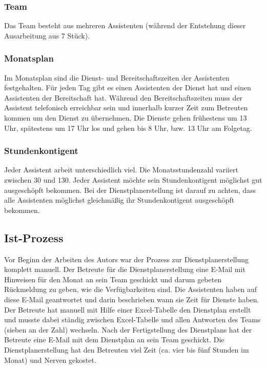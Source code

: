 \documentclass[12pt,a4paper,titlepage]{article} %
\begin{document}
\subsubsection{Team}
Das Team besteht aus mehreren Assistenten (während der Entstehung dieser Ausarbeitung aus 7 Stück).

\subsubsection{Monatsplan}
Im Monatsplan sind die Dienst- und Bereitschaftszeiten der Assistenten festgehalten. Für jeden Tag gibt es einen Assistenten der Dienst hat und einen Assistenten der Bereitschaft hat. Während den Bereitschaftszeiten muss der Assistent telefonisch erreichbar sein und innerhalb kurzer Zeit zum Betreuten kommen um den Dienst zu übernehmen. Die Dienste gehen frühestens um 13 Uhr, spätestens um 17 Uhr los und gehen bis 8 Uhr, bzw. 13 Uhr am Folgetag. 

\subsubsection{Stundenkontigent}
Jeder Assistent arbeit unterschiedlich viel. Die Monatsstundenzahl variiert zwischen 30 und 130. Jeder Assistent möchte sein Stundenkontigent möglichst gut ausgeschöpft bekommen. Bei der Dienstplanerstellung ist darauf zu achten, dass alle Assistenten möglichst gleichmäßig ihr Stundenkontigent ausgeschöpft bekommen. %

\subsection{Ist-Prozess}
Vor Beginn der Arbeiten des Autors war der Prozess zur Dienstplanerstellung komplett manuell. Der Betreute für die Dienstplanerstellung eine E-Mail mit Hinweisen für den Monat an sein Team geschickt und darum gebeten Rückmeldung zu geben, wie die Verfügbarkeiten sind.
Die Assistenten haben auf diese E-Mail geantwortet und darin beschrieben wann sie Zeit für Dienste haben.
Der Betreute hat manuell mit Hilfe einer Excel-Tabelle den Dienstplan erstellt und musste dabei ständig zwischen Excel-Tabelle und allen Antworten des Teams (sieben an der Zahl) wechseln. Nach der Fertigstellung des Dienstplans hat der Betreute eine E-Mail mit dem Dienstplan an sein Team geschickt.
Die Dienstplanerstellung hat den Betreuten viel Zeit (ca. vier bis fünf Stunden im Monat) und Nerven gekostet.
\end{document}
